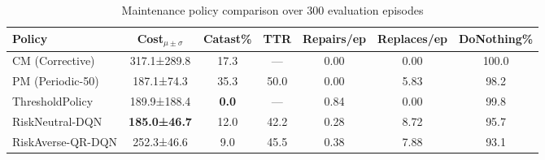 \begin{table}[h]
\centering
\caption{Maintenance policy comparison over 300 evaluation episodes}
\label{tab:policy_comparison}
\begin{tabular}{lcccccc}
\toprule
Policy & Cost$_{\mu \pm \sigma}$ & Catast\% & TTR & Repairs/ep & Replaces/ep & DoNothing\% \\
\midrule
CM (Corrective) & 317.1±289.8 & 17.3 & — & 0.00 & 0.00 & 100.0 \\
PM (Periodic-50) & 187.1±74.3 & 35.3 & 50.0 & 0.00 & 5.83 & 98.2 \\
ThresholdPolicy & 189.9±188.4 & \textbf{0.0} & — & 0.84 & 0.00 & 99.8 \\
RiskNeutral-DQN & \textbf{185.0±46.7} & 12.0 & 42.2 & 0.28 & 8.72 & 95.7 \\
RiskAverse-QR-DQN & 252.3±46.6 & 9.0 & 45.5 & 0.38 & 7.88 & 93.1 \\
\bottomrule
\end{tabular}
\end{table}
